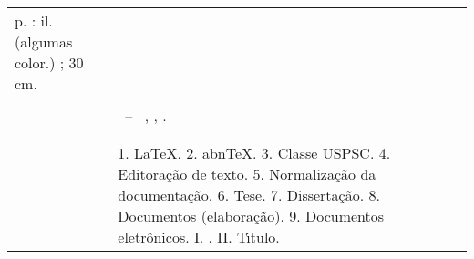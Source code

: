 \begin{fichacatalografica}
\begin{center}
\begin{table}[Htb]
\begin{tabular}{|p{0.9cm} p{8.7cm}|}
			\hspace{0.4cm}\pageref{LastPage} p. : il. (algumas color.) ; 30 cm.\\ 
		  & \\
		  & 
		    \hspace{0.4cm}\imprimirnotaficha ~--~ 
						  \imprimirunidademin, 
						  \imprimiruniversidademin, 
		                  \imprimirdata. \\ 
		  & \\                 
		  & \\ 
		  & \hspace{0.4cm}1. LaTeX. 2. abnTeX. 3. Classe USPSC. 4. Editora\c{c}\~ao de texto. 5. Normaliza\c{c}\~ao da documenta\c{c}\~ao. 6. Tese. 7. Disserta\c{c}\~ao. 8. Documentos (elabora\c{c}\~ao). 9. Documentos eletr\^onicos. I. \imprimirorientadorficha. 
		   II. T\'{\i}tulo. \\
	
		  \hline
	\end{tabular}
  \end{table}
\end{center}
\end{fichacatalografica}


